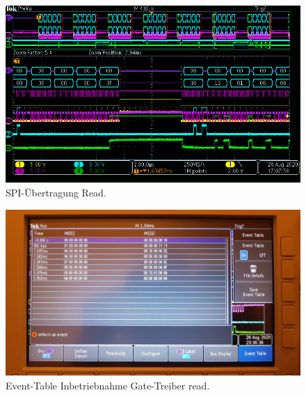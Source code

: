 \begin{figure}[H]
\center
\includegraphics[width = \textwidth]{graphics/TMC6200_Lesen}
\caption{SPI-Übertragung Read.}
\label{fig:TMC6200_Lesen}
\end{figure}
%

\begin{figure}[H]
\center
\includegraphics[width = \textwidth]{graphics/TMC6200_EventTable_Lesen_Bild}
\caption{Event-Table Inbetriebnahme Gate-Treiber read.}
\label{fig:TMC6200_EventTable_Lesen_Bild}
\end{figure}





